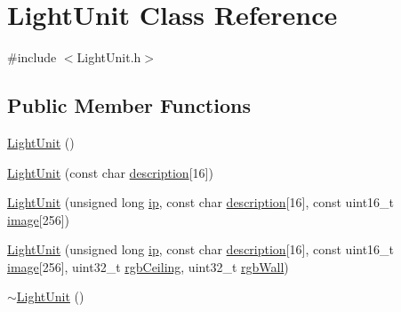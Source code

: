 \hypertarget{classLightUnit}{}\section{Light\+Unit Class Reference}
\label{classLightUnit}


{\ttfamily \#include $<$Light\+Unit.\+h$>$}

\subsection*{Public Member Functions}
\begin{DoxyCompactItemize}
\item 
\mbox{\hyperlink{classLightUnit_a28169090402e0a891c35a881760e14bd}{Light\+Unit}} ()
\item 
\mbox{\hyperlink{classLightUnit_aa44c2d7b6e764c9bbca0f5ab19a31553}{Light\+Unit}} (const char \mbox{\hyperlink{classLightUnit_aad36ad5ba65b93a30ee35ef1f6895b5a}{description}}\mbox{[}16\mbox{]})
\item 
\mbox{\hyperlink{classLightUnit_afb696351f25e3766eb18d6ce31f97fa6}{Light\+Unit}} (unsigned long \mbox{\hyperlink{classLightUnit_a7d490bbccb134d200628eee46ab8fb3d}{ip}}, const char \mbox{\hyperlink{classLightUnit_aad36ad5ba65b93a30ee35ef1f6895b5a}{description}}\mbox{[}16\mbox{]}, const uint16\+\_\+t \mbox{\hyperlink{classLightUnit_a01f65fda0c55ecd8b1d62911cfa688d2}{image}}\mbox{[}256\mbox{]})
\item 
\mbox{\hyperlink{classLightUnit_ab91f948d033d6982b4b981aea104b1d7}{Light\+Unit}} (unsigned long \mbox{\hyperlink{classLightUnit_a7d490bbccb134d200628eee46ab8fb3d}{ip}}, const char \mbox{\hyperlink{classLightUnit_aad36ad5ba65b93a30ee35ef1f6895b5a}{description}}\mbox{[}16\mbox{]}, const uint16\+\_\+t \mbox{\hyperlink{classLightUnit_a01f65fda0c55ecd8b1d62911cfa688d2}{image}}\mbox{[}256\mbox{]}, uint32\+\_\+t \mbox{\hyperlink{classLightUnit_ae688f610193b69a2f390bd2a44dc2a7c}{rgb\+Ceiling}}, uint32\+\_\+t \mbox{\hyperlink{classLightUnit_a9927e4bcf968e043883688e87935fb4a}{rgb\+Wall}})
\item 
\mbox{\hyperlink{classLightUnit_a29969943be7a664ffc0795ec07cc12c2}{$\sim$\+Light\+Unit}} ()
\end{DoxyCompactItemize}
